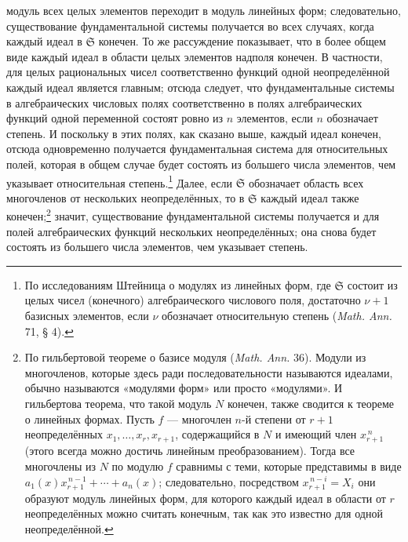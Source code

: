 \documentclass[11pt]{article}
\providecommand{\frS}{\mathfrak S}
\begin{document}
модуль всех целых элементов переходит в модуль линейных форм; следовательно, существование фундаментальной системы получается во всех случаях, когда каждый идеал в \(\frS\) конечен. То же рассуждение показывает, что в более общем виде каждый идеал в области целых элементов надполя конечен. В частности, для целых рациональных чисел соответственно функций одной неопределённой каждый идеал является главным; отсюда следует, что фундаментальные системы в алгебраических числовых полях соответственно в полях алгебраических функций одной переменной состоят ровно из \(n\) элементов, если \(n\) обозначает степень. И поскольку в этих полях, как сказано выше, каждый идеал конечен, отсюда одновременно получается фундаментальная система для относительных полей, которая в общем случае будет состоять из большего числа элементов, чем указывает относительная степень.\footnote{По исследованиям Штейница о модулях из линейных форм, где \(\frS\) состоит из целых чисел (конечного) алгебраического числового поля, достаточно \(\nu+1\) базисных элементов, если \(\nu\) обозначает относительную степень (\emph{Math. Ann.} 71, § 4).} Далее, если \(\frS\) обозначает область всех многочленов от нескольких неопределённых, то в \(\frS\) каждый идеал также конечен;\footnote{По гильбертовой теореме о базисе модуля (\emph{Math. Ann.} 36). Модули из многочленов, которые здесь ради последовательности называются идеалами, обычно называются «модулями форм» или просто «модулями». И гильбертова теорема, что такой модуль \(N\) конечен, также сводится к теореме о линейных формах. Пусть \(f\) --- многочлен \(n\)-й степени от \(r+1\) неопределённых \(x_1,\ldots,x_r,x_{r+1}\), содержащийся в \(N\) и имеющий член \(x_{r+1}^{\,n}\) (этого всегда можно достичь линейным преобразованием). Тогда все многочлены из \(N\) по модулю \(f\) сравнимы с теми, которые представимы в виде \(a_1(x)x_{r+1}^{\,n-1}+\cdots+a_n(x)\); следовательно, посредством \(x_{r+1}^{\,n-i}=X_i\) они образуют модуль линейных форм, для которого каждый идеал в области от \(r\) неопределённых можно считать конечным, так как это известно для одной неопределённой.} значит, существование фундаментальной системы получается и для полей алгебраических функций нескольких неопределённых; она снова будет состоять из большего числа элементов, чем указывает степень.
\end{document}
